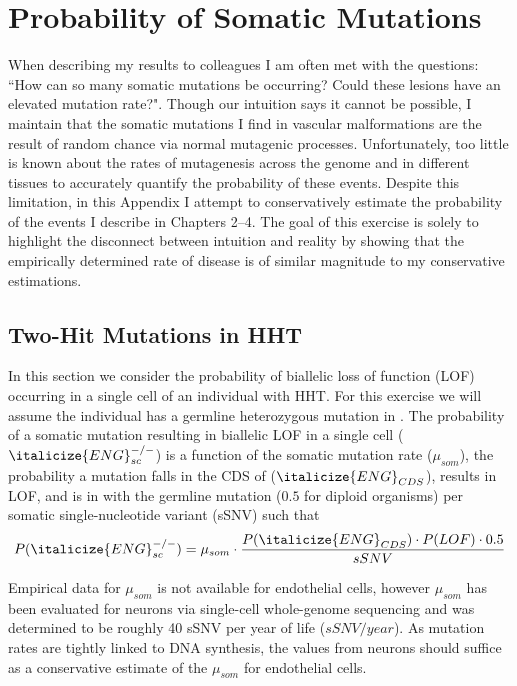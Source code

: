 \chapter{Probability of Somatic Mutations}
\clearpage

When describing my results to colleagues I am often met with the questions: ``How can so many somatic mutations be occurring? Could these lesions have an elevated mutation rate?". Though our intuition says it cannot be possible, I maintain that the somatic mutations I find in vascular malformations are the result of random chance via normal mutagenic processes. Unfortunately, too little is known about the rates of mutagenesis across the genome and in different tissues to accurately quantify the probability of these events. Despite this limitation, in this Appendix I attempt to conservatively estimate the probability of the events I describe in Chapters 2--4. The goal of this exercise is solely to highlight the disconnect between intuition and reality by showing that the empirically determined rate of disease is of similar magnitude to my conservative estimations. 

\section{Two-Hit Mutations in HHT}
In this section we consider the probability of biallelic loss of function (LOF) occurring in a single cell of an individual with HHT. For this exercise we will assume the individual has a germline heterozygous mutation in . The probability of a somatic mutation resulting in biallelic LOF in a single cell ($\italicize{ENG}_{sc}^{-/-}$) is a function of the somatic mutation rate ($\mu_{som}$), the probability a mutation falls in the CDS of  ($\italicize{ENG}_{CDS}$), results in LOF, and is in  with the germline mutation ($0.5$ for diploid organisms) per somatic single-nucleotide variant (sSNV) such that
\begin{equation*}
P(\italicize{ENG}_{sc}^{-/-}) = \mu_{som} \cdot \frac{P(\italicize{ENG}_{CDS}) \cdot P(LOF) \cdot 0.5}{sSNV}
\end{equation*}

Empirical data for $\mu_{som}$ is not available for endothelial cells, however $\mu_{som}$ has been evaluated for neurons via single-cell whole-genome sequencing \citep{lodato2018} and was determined to be roughly 40 sSNV per year of life ($sSNV/year$). As mutation rates are tightly linked to DNA synthesis, the values from neurons should suffice as a conservative estimate of the $\mu_{som}$ for endothelial cells. 

